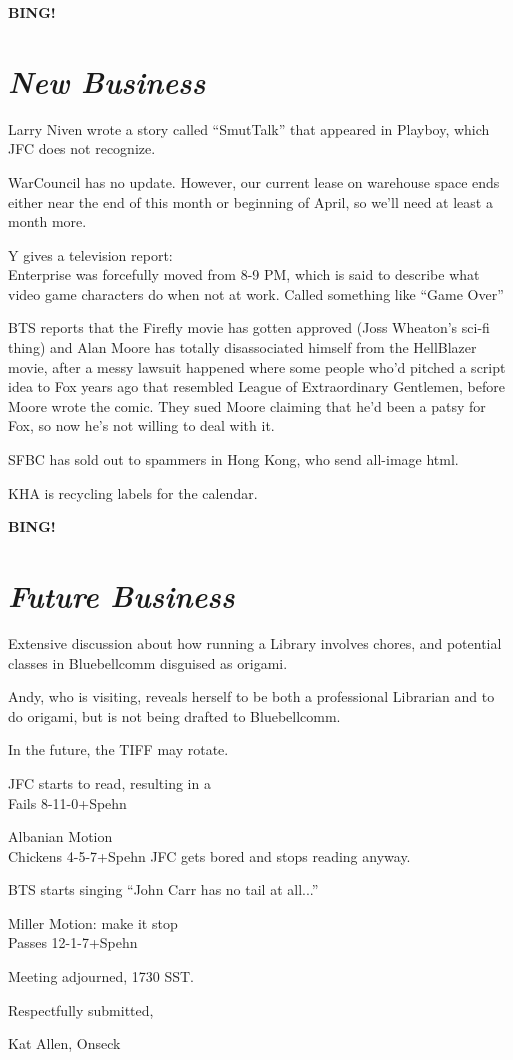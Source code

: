 \documentclass[10pt]{article}
\newcommand{\bing}{{\bf BING!} }
\newcommand{\goto}[1]{\bing \vskip 12pt \section*{{\em{#1}}}}
\begin{document}
\goto{New Business}
Larry Niven wrote a story called ``SmutTalk'' that appeared in
Playboy, which JFC does not recognize.

WarCouncil has no update. However, our current lease on warehouse
space ends either near the end of this month or beginning of April, so
we'll need at least a month more. 

Y gives a television report:\\
Enterprise was forcefully moved from 8-9 PM, which is said to describe
what video game characters do when not at work. Called something like
``Game Over''

BTS reports that the Firefly movie has gotten approved (Joss Wheaton's
sci-fi thing) and Alan Moore has totally disassociated himself from
the HellBlazer movie, after a messy lawsuit happened where some people
who'd pitched a script idea to Fox years ago that resembled League of
Extraordinary Gentlemen, before Moore wrote the comic.  They sued
Moore claiming that he'd been a patsy for Fox, so now he's not willing
to deal with it.

SFBC has sold out to spammers in Hong Kong, who send all-image html.

KHA is recycling labels for the calendar.

\goto{Future Business}
Extensive discussion about how running a Library involves chores, and
potential classes in Bluebellcomm disguised as origami.

Andy, who is visiting, reveals herself to be both a professional
Librarian and to do origami, but is not being drafted to Bluebellcomm.

In the future, the TIFF may rotate.

JFC starts to read, resulting in a \\
Fails 8-11-0+Spehn

Albanian Motion\\
Chickens 4-5-7+Spehn
JFC gets bored and stops reading anyway.

BTS starts singing ``John Carr has no tail at all...''

Miller Motion: make it stop\\
Passes 12-1-7+Spehn

\vspace{12pt}

\noindent
Meeting adjourned, 1730 SST.

\vspace{18pt}

\centerline{Respectfully submitted,}
\centerline{Kat Allen,  Onseck}
\end{document}
